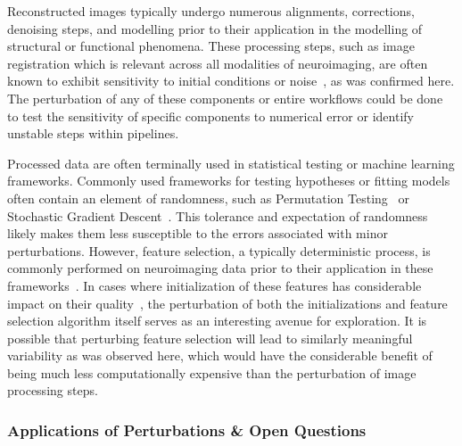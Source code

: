 Reconstructed images typically undergo numerous alignments, corrections, denoising steps, and modelling prior to their
application in the modelling of structural or functional phenomena. These processing steps, such as image registration
which is relevant across all modalities of neuroimaging, are often known to exhibit sensitivity to initial conditions
or noise~\cite{salari2020file}, as was confirmed here. The perturbation of any of these components or entire workflows
could be done to test the sensitivity of specific components to numerical error or identify unstable steps within
pipelines.

Processed data are often terminally used in statistical testing or machine learning frameworks. Commonly used
frameworks for testing hypotheses or fitting models often contain an element of randomness, such as Permutation
Testing~\cite{oden1975arguments} or Stochastic Gradient Descent~\cite{bottou1991stochastic}. This tolerance and
expectation of randomness likely makes them less susceptible to the errors associated with minor perturbations.
However, feature selection, a typically deterministic process, is commonly performed on neuroimaging data prior to
their application in these frameworks~\cite{mwangi2014review}. In cases where initialization of these features has
considerable impact on their quality~\cite{kobak2021init}, the perturbation of both the initializations and feature
selection algorithm itself serves as an interesting avenue for exploration. It is possible that perturbing feature
selection will lead to similarly meaningful variability as was observed here, which would have the considerable benefit
of being much less computationally expensive than the perturbation of image processing steps.

\subsubsection{Applications of Perturbations \& Open Questions}

